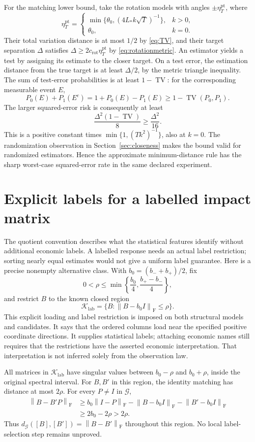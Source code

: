 \documentclass[11pt,a4paper]{article}
\numberwithin{equation}{section}
\newcommand{\cG}{\mathcal G}
\newcommand{\F}{\mathrm F}
\newcommand{\norm}[1]{\left\lVert #1\right\rVert}
\DeclareMathOperator{\TV}{TV}
\begin{document}
For the matching lower bound, take the rotation models with angles
\(\pm\eta_T^{\mathrm{pt}}\), where
\[
 \eta_T^{\mathrm{pt}}=
 \begin{cases}
  \min\{\theta_0,(4L_*k\sqrt T)^{-1}\},&k>0,\\
  \theta_0,&k=0.
 \end{cases}
\]
Their total variation distance is at most \(1/2\) by \eqref{eq:TV},
and their target separation \(\Delta\) satisfies
\(\Delta\ge2c_{\mathrm{rot}}\eta_T^{\mathrm{pt}}\)
by \eqref{eq:rotationmetric}.
An estimator yields a test by assigning its estimate to the closer
target. On a test error, the estimation distance from the true target
is at least \(\Delta/2\), by the metric triangle inequality.
The sum of test-error probabilities is at least \(1-\TV\):
for the corresponding measurable event \(E\),
\[
 P_0(E)+P_1(E^c)
 =1+P_0(E)-P_1(E)\ge1-\TV(P_0,P_1).
\]
The larger squared-error risk is consequently at least
\[
 \frac{\Delta^2(1-\TV)}8\ge\frac{\Delta^2}{16}.
\]
This is a positive constant times
\(\min\{1,(Tk^2)^{-1}\}\), also at \(k=0\).
The randomization observation in Section~\ref{sec:closeness} makes the
bound valid for randomized estimators.
Hence the approximate minimum-distance rule has the sharp worst-case
squared-error rate in the same declared experiment.

\section{Explicit labels for a labelled impact matrix}\label{sec:labels}
The quotient convention describes what the statistical features identify
without additional economic labels. A labelled response needs an actual
label restriction; sorting nearly equal estimates would not give a
uniform label guarantee.
Here is a precise nonempty alternative class.
With \(b_0=(b_-+b_+)/2\), fix
\[
 0<\rho\le\min\left\{\frac{b_0}{4},\frac{b_+-b_-}{4}\right\},
\]
and restrict \(B\) to the known closed region
\[
 \mathcal K_{\mathrm{lab}}
 =\{B:\norm{B-b_0I}_{\F}\le\rho\}.
\]
This explicit loading and label restriction is imposed on both structural
models and candidates. It says that the ordered columns load near the
specified positive coordinate directions. It supplies statistical labels;
attaching economic names still requires that the restrictions have the
asserted economic interpretation. That interpretation is not inferred
solely from the observation law.

All matrices in \(\mathcal K_{\mathrm{lab}}\) have singular values between
\(b_0-\rho\) and \(b_0+\rho\), inside the original spectral interval.
For \(B,B'\) in this region, the identity matching has distance at most
\(2\rho\). For every \(P\ne I\) in \(\cG\),
\begin{align*}
 \norm{B-B'P}_{\F}
 &\ge b_0\norm{I-P}_{\F}
       -\norm{B-b_0I}_{\F}-\norm{B'-b_0I}_{\F}\\
 &\ge2b_0-2\rho>2\rho.
\end{align*}
Thus \(d_{\cG}([B],[B'])=\norm{B-B'}_{\F}\) throughout this region.
No local label-selection step remains unproved.
\end{document}
